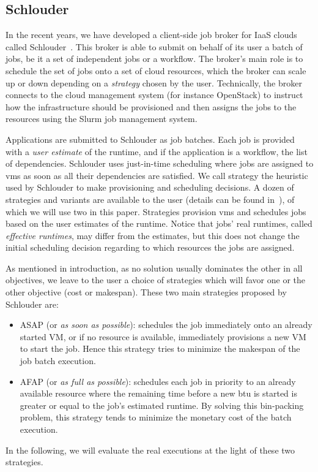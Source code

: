 \documentclass[10pt,conference,compsocconf]{IEEEtran}
\begin{document}
\subsection{Schlouder}
In the recent years, we have developed a client-side job broker for IaaS clouds
called Schlouder~\cite{Michon17}. This broker is able to submit on behalf of its
user a  batch of  jobs, be  it a  set of  independent jobs  or a  workflow.  The
broker's main role is to schedule the set of jobs onto a set of cloud resources,
which the broker can  scale up or down depending on  a \emph{strategy} chosen by
the user.  Technically, the broker connects  to the cloud management system (for
instance OpenStack) to  instruct how the infrastructure  should be provisioned
and  then assigns  the jobs  to  the resources  using the  Slurm job  management
system. 

Applications are submitted to Schlouder as job batches. Each job is provided with
a \emph{user estimate} of the runtime, and if the application is a workflow, the
list of  dependencies. Schlouder  uses just-in-time  scheduling where
jobs  are  assigned   to  \acp{vm}  as  soon  as  all   their  dependencies  are
satisfied. We call strategy the heuristic used by Schlouder to make provisioning
and scheduling decisions.   A dozen of strategies and variants  are available to
the user (details can be found in~\cite{GenaudG11}), of which we will use two in
this paper. Strategies  provision \acp{vm} and schedules jobs based  on the user
estimates   of  the   runtime.   Notice  that   jobs'   real  runtimes,   called
\emph{effective  runtimes}, may  differ from  the estimates,  but this  does not
change the initial scheduling decision regarding to which resources the jobs are
assigned.

As mentioned in introduction, as no solution usually dominates the other in all
objectives, we leave to the user a choice of strategies which will favor one or
the other objective (cost or makespan). These two main strategies proposed by
Schlouder are:
\begin{itemize}
\item ASAP (or \textit{as soon as possible}): schedules the job immediately onto
  an already started VM, or if  no resource is available, immediately provisions
  a new VM to start the job.  Hence this strategy tries to minimize the makespan
  of the job batch execution.

\item AFAP (or \textit{as full as  possible}): schedules each job in priority to
	an already  available resource where  the remaining time  before a new
	\ac{btu} is started is greater or equal to the job's estimated runtime.
	By solving this bin-packing problem, this strategy tends to minimize the
	monetary cost of the batch execution.
\end{itemize}
In the following, we will evaluate the real executions at the light of these two
strategies.
\end{document}
